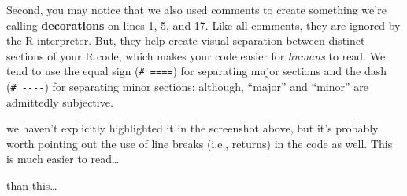 \documentclass[
  letterpaper,
  DIV=11,
  numbers=noendperiod]{scrreprt}
\newenvironment{Shaded}{\begin{snugshade}}{\end{snugshade}}
\newcommand{\CommentTok}[1]{\textcolor[rgb]{0.37,0.37,0.37}{#1}}
\newcommand{\DocumentationTok}[1]{\textcolor[rgb]{0.37,0.37,0.37}{\textit{#1}}}
\newcommand{\FunctionTok}[1]{\textcolor[rgb]{0.28,0.35,0.67}{#1}}
\newcommand{\NormalTok}[1]{\textcolor[rgb]{0.00,0.23,0.31}{#1}}
\newcommand{\SpecialCharTok}[1]{\textcolor[rgb]{0.37,0.37,0.37}{#1}}
\newcommand{\StringTok}[1]{\textcolor[rgb]{0.13,0.47,0.30}{#1}}
\begin{document}
Second, you may notice that we also used comments to create something
we're calling \textbf{decorations} on lines 1, 5, and 17. Like all
comments, they are ignored by the R interpreter. But, they help create
visual separation between distinct sections of your R code, which makes
your code easier for \emph{humans} to read. We tend to use the equal
sign (\texttt{\#\ ====}) for separating major sections and the dash
(\texttt{\#\ -\/-\/-\/-}) for separating minor sections; although,
``major'' and ``minor'' are admittedly subjective.

we haven't explicitly highlighted it in the screenshot above, but it's
probably worth pointing out the use of line breaks (i.e., returns) in
the code as well. This is much easier to read\ldots{}

\begin{Shaded}
\end{Shaded}

than this\ldots{}
\end{document}
